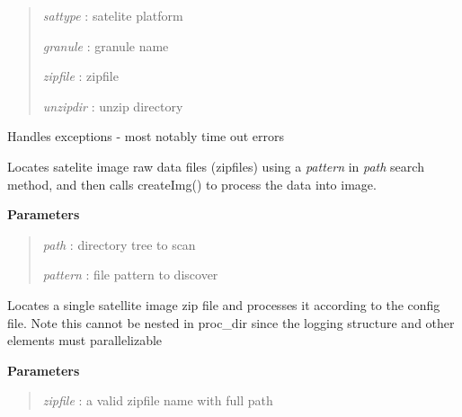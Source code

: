 \documentclass[letterpaper,10pt,english]{sphinxmanual}
\begin{document}
\begin{fulllineitems}
\begin{fulllineitems}
\begin{quote}
\emph{sattype}  : satelite platform

\emph{granule}  : granule name

\emph{zipfile}  : zipfile

\emph{unzipdir} : unzip directory
\end{quote}

\end{fulllineitems}


\begin{fulllineitems}
\label{code:SigLib.SigLib.handler}
Handles exceptions - most notably time out errors

\end{fulllineitems}


\begin{fulllineitems}
\label{code:SigLib.SigLib.proc_Dir}
Locates satelite image raw data files (zipfiles) using a
\emph{pattern} in \emph{path} search method, and then calls createImg()
to process the data into image.

\textbf{Parameters}
\begin{quote}

\emph{path}    : directory tree to scan

\emph{pattern} : file pattern to discover
\end{quote}

\end{fulllineitems}


\begin{fulllineitems}
\label{code:SigLib.SigLib.proc_File}
Locates a single satellite image zip file and processes it according 
to the config file.  Note this cannot be nested in proc\_dir since the 
logging structure and other elements must parallelizable

\textbf{Parameters}
\begin{quote}

\emph{zipfile} : a valid zipfile name with full path
\end{quote}

\end{fulllineitems}


\end{fulllineitems}
\end{document}
